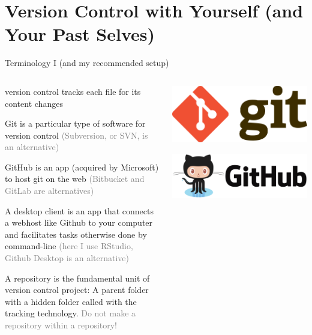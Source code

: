 \documentclass[ignorenonframetext, 10pt, aspectratio=169]{beamer}
\begin{document}
\section{Version Control with Yourself (and Your Past Selves)}

\begin{frame}{Terminology I (and my recommended setup)}
\begin{columns}[T]
\begin{column}{0.65\textwidth}
\begin{wideitemize}
\item<1-> version control \alert{tracks} each file for its content changes
\item<2-> \alert{Git} is a particular type of software for version control \textcolor{gray}{(Subversion, or SVN, is an alternative)}
\item<3-> \alert{GitHub} is an app (acquired by Microsoft) to host git on the web \textcolor{gray}{(Bitbucket and GitLab are alternatives)}
\item<4-> A \alert{desktop client} is an app that connects a webhost like Github to your computer and facilitates tasks otherwise done by \alert{command-line} \textcolor{gray}{(here I use \alert{RStudio}, Github Desktop is an alternative)}
\item<5-> A \alert{repository} is the fundamental unit of version control project: A  parent folder with a hidden folder called  with the tracking technology. \textcolor{gray}{Do not make a repository within a repository!}
\end{wideitemize}
\end{column}
\begin{column}{0.35\textwidth}
\centering
{}\includegraphics[width = 0.6\linewidth]{Git-Logo-2Color.png}

\bigskip
{}\includegraphics[width = 0.6\linewidth]{github-logo-1.png}


\end{column}
\end{columns}
\end{frame}
\end{document}
